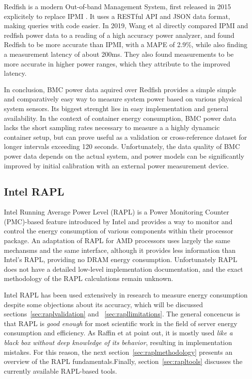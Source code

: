 Redfish is a modern Out-of-band Management System, first released in 2015 explicitely to replace IPMI \parencite{thomas-krenn-redfish}. It uses a RESTful API and JSON data format, making queries with code easier. In 2019, Wang et al\parencite{wang2019empirical} directly compared IPMI and redfish power data to a reading of a high accuracy power analyzer, and found Redfish to be more accurate than IPMI, with a MAPE of 2.9\%, while also finding a measurement latency of about 200ms. They also found measurements to be more accurate in higher power ranges, which they attribute to the improved latency.

In conclusion, BMC power data aquired over Redfish provides a simple simple and comparatively easy way to measure system power based on various physical system sensors. Its biggest strenght lies in easy implementation and general availability. In the context of container energy consumption, BMC power data lacks the short sampling rates necessary to measure a a highly dynamcic container setup, but can prove useful as a validation or cross-reference dataset for longer intervals exceeding 120 seconds. Unfortunately, the data quality of BMC power data depends on the actual system, and power models can be significantly improved by initial calibration with an external power measurement device\parencite{kavanagh2016accuracy}.

\subsection{Intel RAPL}

Intel Running Average Power Level (RAPL) is a Power Monitoring Counter (PMC)-based feature introduced by Intel and provides a way to monitor and control the energy consumption of various components within their processor package\parencite{projectexigence_rapl}. An adaptation of RAPL for AMD processors uses largely the same mechansms and the same interface\parencite{amd_energy}, although it provides less information than Intel's RAPL, providing no DRAM energy consumption\parencite{schone2021energy}. Unfortunately RAPL does not have a detailed low-level implementation documentation, and the exact methodology of the RAPL calculations remain unknown\parencite{jay2023experimental}.

Intel RAPL has been used extensively in research to measure energy consumption\parencite{kennes2023measuring} despite some objections about its accuracy, which will be discussed sections~\ref{sec:raplvalidation} and ~\ref{sec:rapllimitations}. The general concencus is that RAPL is \textit{good enough} for most scientific work in the field of server energy consumption and efficiency. As Raffin et at\parencite{raffin2024dissecting} point out, it is mostly used \textit{like a black box without deep knowledge of its behavior}, resulting in implementation mistakes. For this reason, the next section~\ref{sec:raplmethodology} presents an overview of the RAPL fundamentals.Finally, section~\ref{sec:rapltools} discusses the currently available RAPL-based tools.

